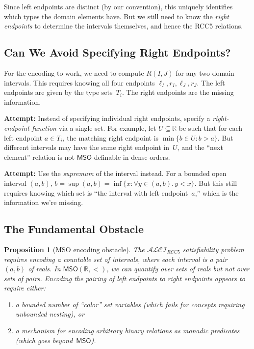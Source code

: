 \documentclass[a4paper,11pt]{article}
\newtheorem{proposition}[theorem]{Proposition}
\theoremstyle{definition}
\newcommand{\ALCIRCC}[1]{\ensuremath{\mathcal{ALCI}_{\mathit{RCC#1}}}}
\newcommand{\MSO}{\ensuremath{\mathsf{MSO}}}
\newcommand{\reals}{\ensuremath{\mathbb{R}}}
\begin{document}
Since left endpoints are distinct (by our convention), this uniquely
identifies which types the domain elements have.  But we still need
to know the \emph{right endpoints} to determine the intervals themselves,
and hence the RCC5 relations.

\subsection{Can We Avoid Specifying Right Endpoints?}

For the encoding to work, we need to compute $R(I, J)$ for any two
domain intervals.  This requires knowing all four endpoints
$\ell_I, r_I, \ell_J, r_J$.  The left endpoints are given by the
type sets~$T_i$.  The right endpoints are the missing information.

\textbf{Attempt:} Instead of specifying individual right endpoints,
specify a \emph{right-endpoint function} via a single set.  For
example, let $U \subseteq \reals$ be such that for each left endpoint
$a \in T_i$, the matching right endpoint is $\min\{b \in U : b > a\}$.
But different intervals may have the same right endpoint in~$U$, and
the ``next element'' relation is not $\MSO$-definable in dense orders.

\textbf{Attempt:} Use the \emph{supremum} of the interval instead.
For a bounded open interval $(a,b)$, $b = \sup(a, b) = \inf\{x :
\forall y \in (a,b).\, y < x\}$.  But this still requires knowing
which set is ``the interval with left endpoint~$a$,'' which is the
information we're missing.

\subsection{The Fundamental Obstacle}
\label{sec:obstacle}

\begin{proposition}[MSO encoding obstacle]
\label{prop:obstacle}
The $\ALCIRCC{5}$ satisfiability problem requires encoding a
\emph{countable set of intervals}, where each interval is a pair
$(a, b)$ of reals.  In $\MSO(\reals, <)$, we can quantify over
sets of reals but not over sets of pairs.  Encoding the pairing of
left endpoints to right endpoints appears to require either:
\begin{enumerate}[nosep,label=(\alph*)]
  \item a bounded number of ``color'' set variables \textup{(}which
    fails for concepts requiring unbounded nesting\textup{)}, or
  \item a mechanism for encoding arbitrary binary relations as
    monadic predicates \textup{(}which goes beyond~$\MSO$\textup{)}.
\end{enumerate}
\end{proposition}
\end{document}
